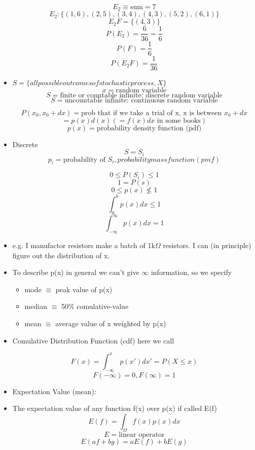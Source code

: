 \begin{itemize}
            \[ E_2 \equiv \text{sum} = 7 \]
            \[ E_2: \{(1,6), (2,5), (3,4), (4,3), (5,2), (6,1)\} \]
            \[ E_2 F = \{(4,3)\} \]
            \[ P(E_2 ) = \frac{6}{36}  = \frac{1}{6}\]
            \[ P(F) = \frac{1}{6}\]
            \[ P(E_2 F) = \frac{1}{36} \]

      \item $S = \{ all possible outcomes of stochastic process, X\} $
            \[ x = \text{random variable} \]
            \[ S = \text{finite or countable infinite: discrete random variable}\]
            \[ S = \text{uncountable infinite: continuous random variable}\]

            \[ P(x_0, x_0 + dx) = \text{prob that if we take a trial of x, x is between } x_0 + dx\]
            \[ = p(x) d(x) (= f(x) dx \text{ in some books})\]
            \[ p(x) = \text{probability density function (pdf)}\]
      \item Discrete
            \[ S = S_i \]
            \[ p_i = \text{probability of } S_i , probability mass function (pmf)\]

            \[ 0 \leq P(S_i) \leq 1\]
            \[ 1 = P(s) \]
            \[ 0 \leq p(x) \nleq 1 \]
            \[ \int_0^b p(x) dx \leq 1 \]
            \[ \int_{-\infty}^{\infty} p(x) dx = 1 \]

      \item e.g. I manufactor resistors make a batch of 1k$\Omega$ resistors. I can (in principle) figure out the distribution of x.

      \item To describe p(x) in general we can't give $\infty$ information, so we specify
            \begin{itemize}
                  \item mode $\equiv$ peak value of p(x)
                  \item median $\equiv$ 50\% comulative-value
                  \item mean $\equiv$ average value of x weighted by p(x)
            \end{itemize}

      \item Comulative Distribution Function (cdf) here we call

            \[ F(x) = \int_{-\infty}^{x} p(x') dx' = P(X \leq x) \]
            \[ F(-\infty) = 0, F(\infty) = 1\]

      \item Expectation Value (mean):
      \item The expectation value of any function f(x) over p(x) if called E(f)
            \[ E(f) = \int_{\Omega} f(x) p(x) dx \]
            \[ E = \text{linear operator}\]
            \[ E(af +bg) = aE(f) + bE(g)\]


\end{itemize}
